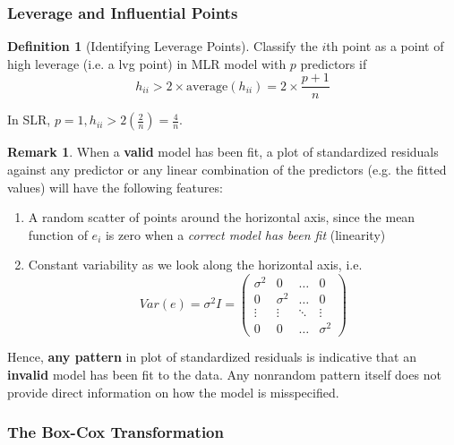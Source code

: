 \documentclass[11pt]{article}
\theoremstyle{definition}
\newtheorem{definition}{Definition}[section]
\newtheorem{remark}{Remark}[section]
\numberwithin{equation}{section}
\begin{document}
\subsubsection{Leverage and Influential Points}
\begin{definition}[Identifying Leverage Points]
Classify the $i$th point as a point of high leverage (i.e. a lvg point) in MLR model with $p$ predictors if
 \begin{equation}
   h_{ii} > 2\times\text{average}(h_{ii}) = 2\times \frac{p+1}{n}
 \end{equation}
\end{definition}
\begin{writenotes}
  In SLR, $p=1, h_{ii} > 2\left(\frac{2}{n}\right)=\frac{4}{n}$.
\end{writenotes}

\begin{remark}
  When a \textbf{valid} model has been fit, a plot of standardized residuals against any predictor or any linear combination of the predictors (e.g. the fitted values) will have the following features:
\begin{enumerate}
  \item A random scatter of points around the horizontal axis, since the mean function of $e_i$ is zero when a \textit{correct model has been fit} (linearity)
  \item Constant variability as we look along the horizontal axis, i.e.
  \begin{equation}
    Var(e)=\sigma^2 I=\begin{pmatrix}\sigma^2&0&\dots&0\\
    0 &\sigma^2&\dots&0\\
    \vdots&\vdots&\ddots&\vdots\\
    0&0&\dots&\sigma^2
    \end{pmatrix}
  \end{equation}

\end{enumerate}
Hence, \textbf{any pattern} in plot of standardized residuals is indicative that an \textbf{invalid} model has been fit to the data. Any nonrandom pattern itself does not provide direct information on how the model is misspecified.
\end{remark}

\subsubsection{The Box-Cox Transformation}
\end{document}
